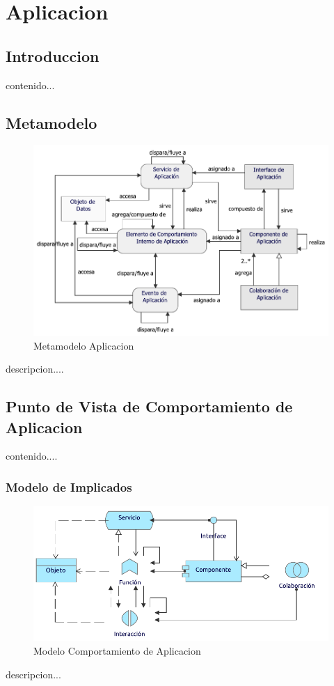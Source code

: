 \chapter{Aplicacion}
\section{Introduccion}
contenido...

\newpage

\section{Metamodelo}
\begin{figure}[h!]
	\centering
	\includegraphics[width=0.9\linewidth]{imgs/meta/Aplicacion}
	\caption{Metamodelo Aplicacion}
\end{figure}

descripcion....

\newpage

\section{Punto de Vista de Comportamiento de Aplicacion}
contenido....
\subsection{Modelo de Implicados}
\begin{figure}[h!]
	\centering
	\includegraphics[width=.8\linewidth]{imgs/modelo/CmtoAplicacion}
	\caption{Modelo Comportamiento de Aplicacion}
\end{figure}
descripcion...

